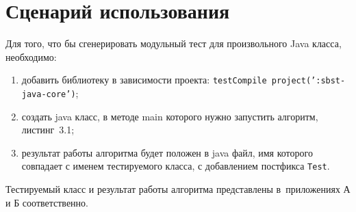 \section{Сценарий использования}

Для того, что бы сгенерировать модульный тест для произвольного Java класса, необходимо:

\begin{enumerate}
	\item добавить библиотеку в зависимости проекта: \texttt{testCompile project(':sbst-java-core')};
	\item создать java класс, в методе main которого нужно запустить алгоритм, листинг~3.1;
	\item результат работы алгоритма будет положен в java файл, имя которого совпадает с именем тестируемого класса, с добавлением постфикса \texttt{Test}. 
\end{enumerate}

Тестируемый класс и результат работы алгоритма представлены в~приложениях А и Б соответственно.
